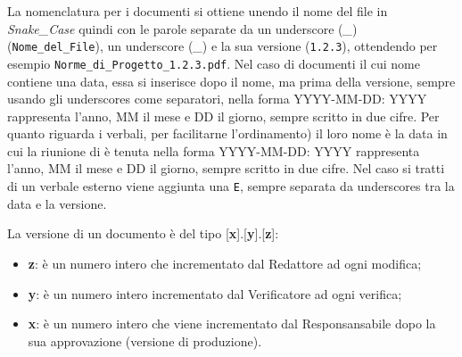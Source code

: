 La nomenclatura per i documenti si ottiene unendo il nome del file in \textit{Snake\_Case} quindi con le parole separate da  un underscore (\textit{\_}) (\texttt{Nome\_del\_File}), un underscore (\textit{\_}) e la sua versione (\texttt{1.2.3}), ottendendo per esempio \texttt{Norme\_di\allowbreak{}\_Progetto\_1.2.3.pdf}. Nel caso di documenti il cui nome contiene una data, essa si inserisce dopo il nome, ma prima della versione, sempre usando gli underscores come separatori, nella forma YYYY-MM-DD: YYYY rappresenta l'anno, MM il mese e DD il giorno, sempre scritto in due cifre.
Per quanto riguarda i  verbali, per facilitarne l'ordinamento) il loro nome è la data in cui la riunione di è tenuta nella forma YYYY-MM-DD: YYYY rappresenta l'anno, MM il mese e DD il giorno, sempre scritto in due cifre. Nel caso si tratti di un verbale esterno viene aggiunta una \texttt{E}, sempre separata da underscores tra la data e la versione.


La versione di un documento è del tipo [\textbf{x}].[\textbf{y}].[\textbf{z}]:
\begin{itemize}
    \item \textbf{z}: è un numero intero che incrementato dal Redattore ad ogni modifica;
    \item \textbf{y}: è un numero intero incrementato dal Verificatore ad ogni verifica;
    \item \textbf{x}: è un numero intero che viene incrementato dal Responsansabile dopo la sua approvazione (versione di produzione).
\end{itemize}

